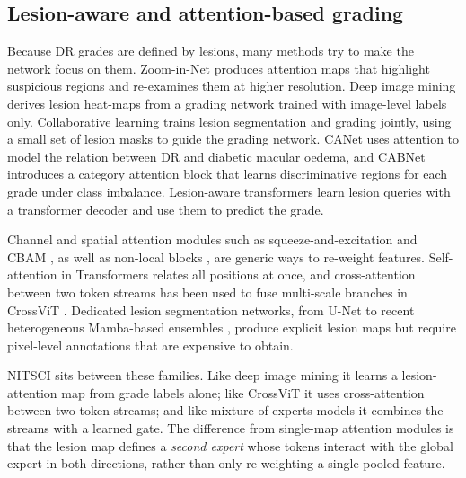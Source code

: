 \subsection{Lesion-aware and attention-based grading}
Because DR grades are defined by lesions, many methods try to make the network focus on them. Zoom-in-Net
\citep{wang2017zoom} produces attention maps that highlight suspicious regions and re-examines them at higher
resolution. Deep image mining \citep{quellec2017deep} derives lesion heat-maps from a grading network trained with
image-level labels only. Collaborative learning \citep{zhou2019collaborative} trains lesion segmentation and grading
jointly, using a small set of lesion masks to guide the grading network. CANet \citep{li2020canet} uses attention to
model the relation between DR and diabetic macular oedema, and CABNet \citep{he2021cabnet} introduces a category
attention block that learns discriminative regions for each grade under class imbalance. Lesion-aware transformers
\citep{sun2021lesion} learn lesion queries with a transformer decoder and use them to predict the grade.

Channel and spatial attention modules such as squeeze-and-excitation \citep{hu2018squeeze} and CBAM
\citep{woo2018cbam}, as well as non-local blocks \citep{wang2018nonlocal}, are generic ways to re-weight features.
Self-attention in Transformers \citep{vaswani2017attention} relates all positions at once, and cross-attention
between two token streams has been used to fuse multi-scale branches in CrossViT \citep{chen2021crossvit}. Dedicated
lesion segmentation networks, from U-Net \citep{ronneberger2015unet} to recent heterogeneous Mamba-based ensembles
\citep{wu2026helnet,gu2023mamba}, produce explicit lesion maps but require pixel-level annotations that are expensive
to obtain.

NITSCI sits between these families. Like deep image mining it learns a lesion-attention map from grade labels alone;
like CrossViT it uses cross-attention between two token streams; and like mixture-of-experts models
\citep{jacobs1991adaptive,shazeer2017outrageously} it combines the streams with a learned gate. The difference from
single-map attention modules is that the lesion map defines a \emph{second expert} whose tokens interact with the
global expert in both directions, rather than only re-weighting a single pooled feature.

